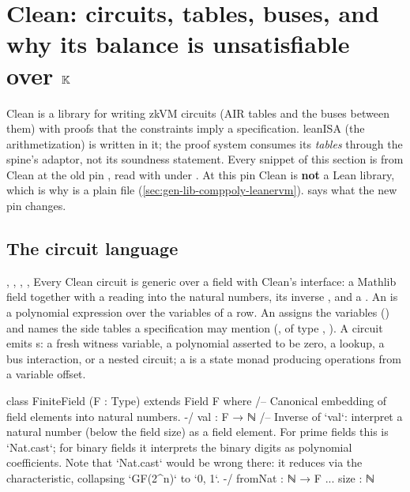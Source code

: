 \begingroup\sloppy
\section{Clean: circuits, tables, buses, and why its balance is unsatisfiable over \texorpdfstring{$\mathbb{K}$}{K}}\label{sec:gen-lib-clean}

Clean is a library for writing zkVM circuits (AIR tables and the buses between them) with proofs
that the constraints imply a specification. leanISA (the arithmetization) is written in it; the
proof system consumes its \emph{tables} through the spine's adaptor, not its soundness statement.
Every snippet of this section is from Clean at the old pin , read with
 under \allowbreak{}\allowbreak{}. At this pin Clean is
\textbf{not} a Lean  library, which is why
\allowbreak{}\allowbreak{} is a plain file (\cref{sec:gen-lib-comppoly-leanervm}).
 says what the new pin  changes.

\subsection{The circuit language}\label{sec:gen-lib-clean-circuit}

\begin{define}{, , , , }
Every Clean circuit is generic over a field with Clean's  interface: a Mathlib
field together with a reading  into the natural numbers, its inverse ,
and a . An  is a polynomial expression over the variables of a row.
An  assigns the variables () and names the side tables a
specification may mention (, of type
, ). A
circuit emits s: a fresh witness variable, a polynomial asserted to be zero, a
lookup, a bus interaction, or a nested circuit; a  is a state monad producing
operations from a variable offset.
\end{define}

\begin{leancode}
class FiniteField (F : Type) extends Field F where
  /-- Canonical embedding of field elements into natural numbers. -/
  val : F → ℕ
  /-- Inverse of `val`: interpret a natural number (below the field size) as a field
  element. For prime fields this is `Nat.cast`; for binary fields it interprets the
  binary digits as polynomial coefficients. Note that `Nat.cast` would be wrong there:
  it reduces via the characteristic, collapsing `GF(2^n)` to `{0, 1}`. -/
  fromNat : ℕ → F
  ...
  size : ℕ
\end{leancode}

